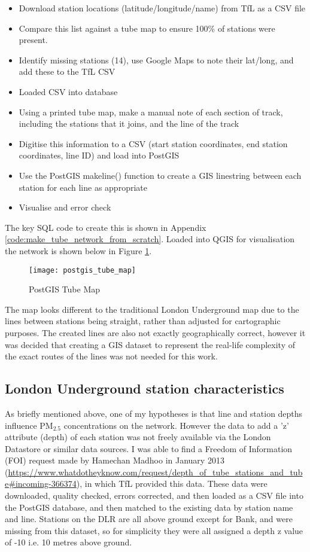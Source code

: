 \begin{itemize}
\item Download station locations (latitude/longitude/name) from TfL as a CSV file
\item Compare this list against a tube map to ensure 100\% of stations were present.
\item Identify missing stations (14), use Google Maps to note their lat/long, and add these to the TfL CSV
\item Loaded CSV into database
\item Using a printed tube map, make a manual note of each section of track, including the stations that it joins, and the line of the track
\item Digitise this information to a CSV (start station coordinates, end station coordinates, line ID) and load into PostGIS
\item Use the PostGIS makeline() function to create a GIS linestring between each station for each line as appropriate
\item Visualise and error check
\end{itemize}

The key SQL code to create this is shown in Appendix \autoref{code:make_tube_network_from_scratch}. Loaded into QGIS for visualisation the network is shown below in Figure \ref{fig:postgis_tube_map}.

\begin{figure}[H]
\centering
\texttt{[image: postgis\_tube\_map]}
\caption{PostGIS Tube Map}
\label{fig:postgis_tube_map}
\end{figure}

The map looks different to the traditional London Underground map due to the lines between stations being straight, rather than adjusted for cartographic purposes. The created lines are also not exactly geographically correct, however it was decided that creating a GIS dataset to represent the real-life complexity of the exact routes of the lines was not needed for this work.

\subsection{London Underground station characteristics}
\label{subsec:station_characteristics}
As briefly mentioned above, one of my hypotheses is that line and station depths influence PM$_{2.5}$ concentrations on the network. However the data to add a 'z' attribute (depth) of each station was not freely available via the London Datastore or similar data sources. I was able to find a Freedom of Information (FOI) request made by Hamechan Madhoo in January 2013 (\url{https://www.whatdotheyknow.com/request/depth_of_tube_stations_and_tube#incoming-366374}), in which TfL provided this data. These data were downloaded, quality checked, errors corrected, and then loaded as a CSV file into the PostGIS database, and then matched to the existing data by station name and line. Stations on the DLR are all above ground except for Bank, and were missing from this dataset, so for simplicity they were all assigned a depth z value of -10 i.e. 10 metres above ground.

